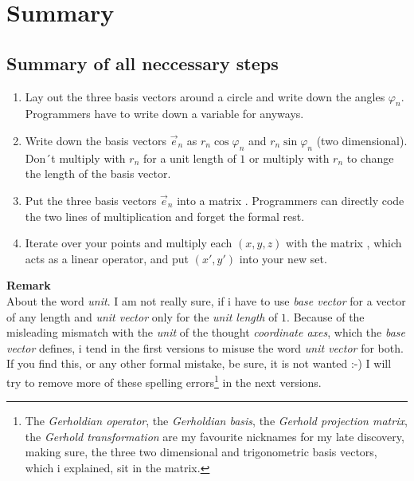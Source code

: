 \documentclass[a4paper]{article}
\begin{document}
\section{Summary}

\subsection{Summary of all neccessary steps}
\begin{enumerate}
\item Lay out the three basis vectors around a circle and write down the angles $\varphi_n$. Programmers have to write down a variable for anyways.
\item Write down the basis vectors $\vec{e}_n$ as $r_n \cos \varphi_n$ and $r_n \sin \varphi_n$ (two dimensional). Don´t multiply with $r_n$ for a unit length of $1$ or multiply with $r_n$ to change the length of the basis vector.
\item Put the three basis vectors $\vec{e}_n$ into a matrix . Programmers can directly code the two lines of multiplication and forget the formal rest.
\item Iterate over your points and multiply each $(x,y,z)$ with the matrix , which acts as a linear operator, and put $(x',y')$ into your new set.
\end{enumerate}

\textbf{Remark}\\
About the word \emph{unit}. I am not really sure, if i have to use \emph{base vector} for a vector of any length and \emph{unit vector} only for the \emph{unit length} of $1$. Because of the misleading mismatch with the \emph{unit} of the thought \emph{coordinate axes}, which the \emph{base vector} defines, i tend in the first versions to misuse the word \emph{unit vector} for both. If you find this, or any other formal mistake, be sure, it is not wanted :-) I will try to remove more of these spelling errors\footnote{The \emph{Gerholdian operator}, the \emph{Gerholdian basis}, the \emph{Gerhold projection matrix}, the \emph{Gerhold transformation} are my favourite nicknames for my late discovery, making sure, the three two dimensional and trigonometric basis vectors, which i explained, sit in the matrix.} in the next versions.
\end{document}
